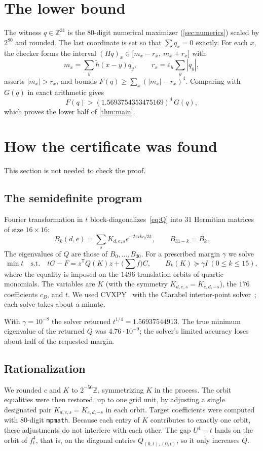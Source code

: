 \documentclass[11pt]{amsart}
\theoremstyle{definition}
\theoremstyle{remark}
\newcommand{\Z}{\mathbb{Z}}
\begin{document}
\section{The lower bound}\label{sec:lower}

The witness $q\in\Z^{31}$ is the $80$-digit numerical maximizer (\cref{sec:numerics}) scaled by $2^{80}$ and rounded. The last coordinate is set so that $\sum q_x=0$ exactly. For each $x$, the checker forms the interval $(Hq)_x\in\bigl[m_x-r_x,\ m_x+r_x\bigr]$ with
\[
  m_x=\sum_y\tilde h(x-y)q_y,\qquad r_x=\varepsilon_h\sum_y|q_y|,
\]
asserts $|m_x|>r_x$, and bounds $F(q)\ge\sum_x(|m_x|-r_x)^4$. Comparing with $G(q)$ in exact arithmetic gives
\[
  F(q)>(1.5693754353475169)^4\,G(q),
\]
which proves the lower half of \cref{thm:main}.

\section{How the certificate was found}\label{sec:search}

This section is not needed to check the proof.

\subsection{The semidefinite program}
Fourier transformation in $t$ block-diagonalizes~\eqref{eq:Q} into $31$ Hermitian matrices of size $16\times16$:
\[
  B_k(d,e)=\sum_sK_{d,e,s}e^{-2\pi iks/31},\qquad B_{31-k}=\overline{B_k}.
\]
The eigenvalues of $Q$ are those of $B_0,\dots,B_{30}$. For a prescribed margin $\gamma$ we solve
\[
  \min t\quad\text{s.t.}\quad tG-F=z^{\mathsf T}Q(K)z+\bigl(\textstyle\sum f\bigr)C,\qquad B_k(K)\succeq\gamma I\ (0\le k\le15),
\]
where the equality is imposed on the $1496$ translation orbits of quartic monomials. The variables are $K$ (with the symmetry $K_{d,e,s}=K_{e,d,-s}$), the $176$ coefficients $c_B$, and $t$. We used CVXPY~\cite{CVXPY} with the Clarabel interior-point solver~\cite{Clarabel}; each solve takes about a minute.

With $\gamma=10^{-8}$ the solver returned $t^{1/4}=1.56937544913$. The true minimum eigenvalue of the returned $Q$ was $4.76\cdot10^{-9}$; the solver's limited accuracy loses about half of the requested margin.

\subsection{Rationalization}
We rounded $c$ and $K$ to $2^{-50}\Z$, symmetrizing $K$ in the process. The orbit equalities were then restored, up to one grid unit, by adjusting a single designated pair $K_{d,e,s}=K_{e,d,-s}$ in each orbit. Target coefficients were computed with $80$-digit \texttt{mpmath}. Because each entry of $K$ contributes to exactly one orbit, these adjustments do not interfere with each other. The gap $U^4-t$ lands on the orbit of $f_t^4$, that is, on the diagonal entries $Q_{(0,t),(0,t)}$, so it only increases $Q$.
\end{document}
